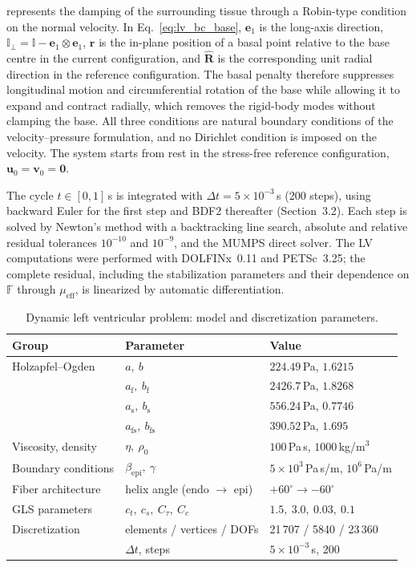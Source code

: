 represents the damping of the surrounding tissue through a Robin-type condition on the
normal velocity. In Eq.~\eqref{eq:lv_bc_base}, $\mathbf{e}_1$ is the long-axis direction,
$\mathbb{I}_\perp=\mathbb{I}-\mathbf{e}_1\otimes\mathbf{e}_1$, $\mathbf{r}$ is the in-plane
position of a basal point relative to the base centre in the current configuration, and
$\hat{\mathbf{R}}$ is the corresponding unit radial direction in the reference configuration.
The basal penalty therefore suppresses longitudinal motion and circumferential rotation of
the base while allowing it to expand and contract radially, which removes the rigid-body
modes without clamping the base. All three conditions are natural boundary conditions of the
velocity--pressure formulation, and no Dirichlet condition is imposed on the velocity. The
system starts from rest in the stress-free reference configuration,
$\mathbf{u}_0=\mathbf{v}_0=\mathbf{0}$.

The cycle $t\in[0,1]$\,s is integrated with $\Delta t=5\times10^{-3}$\,s (200 steps), using
backward Euler for the first step and BDF2 thereafter (Section~3.2). Each step is solved by
Newton's method with a backtracking line search, absolute and relative residual tolerances
$10^{-10}$ and $10^{-9}$, and the MUMPS direct solver. The LV computations were performed
with DOLFINx~0.11 and PETSc~3.25; the complete residual, including the stabilization
parameters and their dependence on $\mathbb{F}$ through $\mu_{\mathrm{eff}}$, is linearized by
automatic differentiation.

\begin{table}[htbp]
  \centering
  \caption{Dynamic left ventricular problem: model and discretization parameters.}
  \label{tab:lv_parameters}
  \small
  \begin{tabular}{lll}
    \toprule
    Group & Parameter & Value \\
    \midrule
    Holzapfel--Ogden & $a,\ b$ & $224.49$\,Pa, $1.6215$ \\
                     & $a_{\mathrm f},\ b_{\mathrm f}$ & $2426.7$\,Pa, $1.8268$ \\
                     & $a_{\mathrm s},\ b_{\mathrm s}$ & $556.24$\,Pa, $0.7746$ \\
                     & $a_{\mathrm{fs}},\ b_{\mathrm{fs}}$ & $390.52$\,Pa, $1.695$ \\
    Viscosity, density & $\eta,\ \rho_0$ & $100$\,Pa\,s, $1000$\,kg/m$^3$ \\
    Boundary conditions & $\beta_{\mathrm{epi}},\ \gamma$ & $5\times10^{3}$\,Pa\,s/m, $10^{6}$\,Pa/m \\
    Fiber architecture & helix angle (endo $\to$ epi) & $+60^\circ \to -60^\circ$ \\
    GLS parameters & $c_t,\ c_s,\ C_\tau,\ C_c$ & $1.5,\ 3.0,\ 0.03,\ 0.1$ \\
    Discretization & elements / vertices / DOFs & 21\,707 / 5840 / 23\,360 \\
                   & $\Delta t$, steps & $5\times10^{-3}$\,s, 200 \\
    \bottomrule
  \end{tabular}
\end{table}

